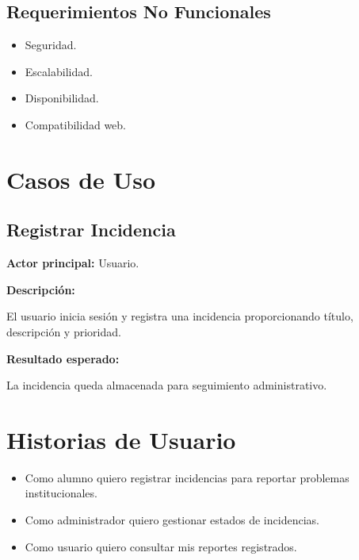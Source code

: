 \documentclass[12pt,letterpaper,oneside]{extreport}
\begin{document}
\section{Requerimientos No Funcionales}

\begin{itemize}
    \item Seguridad.
    
    \item Escalabilidad.
    
    \item Disponibilidad.
    
    \item Compatibilidad web.
\end{itemize}

\chapter{Casos de Uso}

\section{Registrar Incidencia}

\textbf{Actor principal:} Usuario.

\textbf{Descripción:}

El usuario inicia sesión y registra una incidencia proporcionando título, descripción y prioridad.

\textbf{Resultado esperado:}

La incidencia queda almacenada para seguimiento administrativo.

\chapter{Historias de Usuario}

\begin{itemize}
    \item Como alumno quiero registrar incidencias para reportar problemas institucionales.
    
    \item Como administrador quiero gestionar estados de incidencias.
    
    \item Como usuario quiero consultar mis reportes registrados.
\end{itemize}
\end{document}

